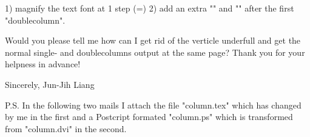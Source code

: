 1) magnify the text font at 1 step  (\magnification=)  
2) add  an  extra  "\singlecolumn"   and   "\doublecolumns"   after   the  first 
   "doublecolumn".

     Would you please tell me how can I get rid of the  verticle  underfull  and
get the normal single- and doublecolumns output at the same page?  Thank you for
your helpness in advance!

                                                             Sincerely,
                                                             Jun-Jih Liang
                                                             
P.S.  In the  following  two  mails I attach  the file  "column.tex"  which  has
changed  by me in the  first  and a  Postcript  formated  "column.ps"  which  is
transformed from "column.dvi" in the second.



